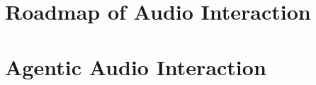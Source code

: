 
\section{Roadmap of Audio Interaction}
\label{roadmap}




% 

\section{Agentic Audio Interaction}
\label{sec:agentic-audio-interaction}



